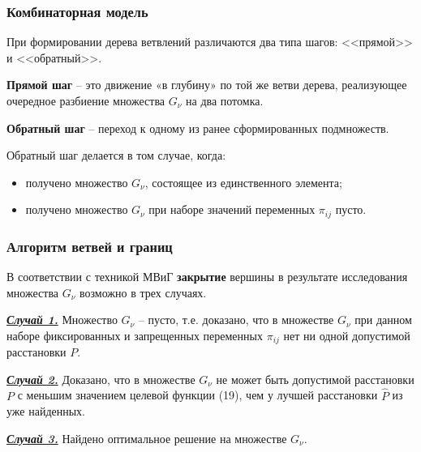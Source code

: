 \begin{frame}
    \frametitle{Комбинаторная модель}
    \justifying
    \begin{minipage}[t]{1\linewidth}
        \fontsize{9pt}{7.2}\selectfont

        При формировании дерева ветвлений различаются два типа шагов: <<прямой>> и <<обратный>>. 
    \end{minipage}
    
    \begin{minipage}[b]{0.5\linewidth}
        \fontsize{9pt}{7.2}\selectfont
        \textbf{Прямой шаг} -- это движение «в глубину» по той же ветви дерева, реализующее очередное разбиение множества $G_\nu$ на два потомка.
        \bigskip

        \textbf{Обратный шаг} -- переход к одному из ранее сформированных подмножеств. 
        \bigskip

        Обратный шаг делается в том случае, когда: 
        \begin{itemize}
            \item  получено множество $G_\nu$, состоящее из единственного элемента;
            \item  получено множество $G_\nu$  при наборе значений переменных $\pi_{ij}$ пусто. 
        \end{itemize}
    \end{minipage}
    \hfill
    \begin{minipage}[b]{0.47\linewidth}
        
    \end{minipage}
    \hfill


\end{frame}

\begin{frame}
    \frametitle{Алгоритм ветвей и границ}
    \justifying
    В соответствии с техникой МВиГ \textbf{закрытие} вершины в результате исследования множества $G_\nu$ возможно в трех случаях.
    \bigskip

    \underline{\textit{\textbf{Случай 1.}}} Множество $G_\nu$ -- пусто, т.е. доказано, что в множестве $G_\nu$ при данном наборе фиксированных и запрещенных переменных $\pi_{ij}$ нет ни одной допустимой расстановки $P$.
    \bigskip

    \underline{\textit{\textbf{Случай 2.}}} Доказано, что в множестве $G_\nu$ не может быть допустимой расстановки $P$ с меньшим значением целевой функции (19), чем у лучшей расстановки $\widehat{P}$ из уже найденных. 
    \bigskip 
    
    \underline{\textit{\textbf{Случай 3.}}} Найдено оптимальное решение на множестве $G_\nu$.

\end{frame}

